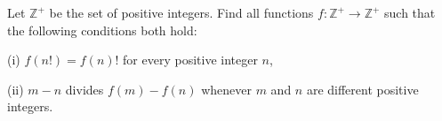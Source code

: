 Let $\mathbb{Z}^+$ be the set of positive integers. Find all functions $f:\mathbb{Z}^+ \rightarrow\mathbb{Z}^+$ such that the following conditions both hold:

(i) $f(n!)=f(n)!$ for every positive integer $n$, 

(ii) $m-n$ divides $f(m)-f(n)$ whenever $m$ and $n$ are different positive integers.